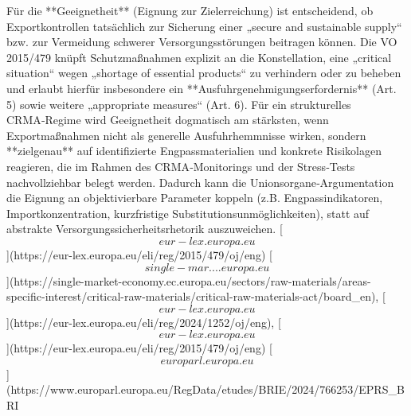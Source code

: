\documentclass[12pt,a4paper,oneside]{book} %
\begin{document}
Für die **Geeignetheit** (Eignung zur Zielerreichung) ist entscheidend, ob Exportkontrollen tatsächlich zur Sicherung einer „secure and sustainable supply“ bzw. zur Vermeidung schwerer Versorgungsstörungen beitragen können. Die VO 2015/479 knüpft Schutzmaßnahmen explizit an die Konstellation, eine „critical situation“ wegen „shortage of essential products“ zu verhindern oder zu beheben und erlaubt hierfür insbesondere ein **Ausfuhrgenehmigungserfordernis** (Art. 5) sowie weitere „appropriate measures“ (Art. 6).  Für ein strukturelles CRMA‑Regime wird Geeignetheit dogmatisch am stärksten, wenn Exportmaßnahmen nicht als generelle Ausfuhrhemmnisse wirken, sondern **zielgenau** auf identifizierte Engpassmaterialien und konkrete Risikolagen reagieren, die im Rahmen des CRMA‑Monitorings und der Stress‑Tests nachvollziehbar belegt werden.  Dadurch kann die Unionsorgane‑Argumentation die Eignung an objektivierbare Parameter koppeln (z.B. Engpassindikatoren, Importkonzentration, kurzfristige Substitutionsunmöglichkeiten), statt auf abstrakte Versorgungssicherheitsrhetorik auszuweichen. [\[eur-lex.europa.eu\]](https://eur-lex.europa.eu/eli/reg/2015/479/oj/eng) [\[single-mar....europa.eu\]](https://single-market-economy.ec.europa.eu/sectors/raw-materials/areas-specific-interest/critical-raw-materials/critical-raw-materials-act/board_en), [\[eur-lex.europa.eu\]](https://eur-lex.europa.eu/eli/reg/2024/1252/oj/eng), [\[eur-lex.europa.eu\]](https://eur-lex.europa.eu/eli/reg/2015/479/oj/eng) [\[europarl.europa.eu\]](https://www.europarl.europa.eu/RegData/etudes/BRIE/2024/766253/EPRS_BRI%
\end{document}
